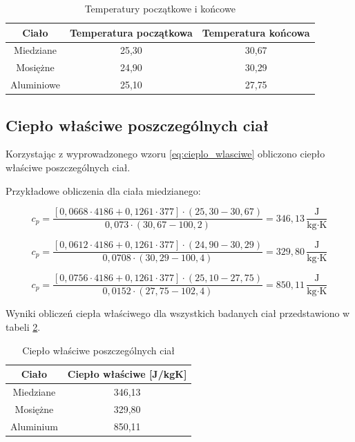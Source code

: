\documentclass[a4paper,12pt]{article}
\begin{document}
\begin{table}[h]
    \centering
    \begin{tabular}{|c|c|c|}
        \hline
        \textbf{Ciało} & \textbf{Temperatura początkowa} & \textbf{Temperatura końcowa} \\
        \hline
        Miedziane & 25{,}30 & 30{,}67 \\
        \hline
        Mosiężne & 24{,}90 & 30{,}29 \\
        \hline
        Aluminiowe & 25{,}10 & 27{,}75 \\
        \hline
    \end{tabular}
    \caption{Temperatury początkowe i końcowe}
    \label{tab:temperatury}
\end{table}




\subsection{Ciepło właściwe poszczególnych ciał}

Korzystając z wyprowadzonego wzoru \ref{eq:cieplo_wlasciwe} obliczono ciepło właściwe poszczególnych ciał.

Przykładowe obliczenia dla ciała miedzianego:

\begin{equation*}
    c_p = \frac{[0{,}0668 \cdot 4186 + 0{,}1261 \cdot 377] \cdot (25{,}30 - 30{,}67)}{0{,}073 \cdot (30{,}67 - 100{,}2)} = 346{,}13\,\frac{\text{J}}{\text{kg} \cdot \text{K}}
\end{equation*}

\begin{equation*}
    c_p = \frac{[0{,}0612 \cdot 4186 + 0{,}1261 \cdot 377] \cdot (24{,}90 - 30{,}29)}{0{,}0708 \cdot (30{,}29 - 100{,}4)} = 329{,}80\,\frac{\text{J}}{\text{kg} \cdot \text{K}}
\end{equation*}

\begin{equation*}
    c_p = \frac{[0{,}0756 \cdot 4186 + 0{,}1261 \cdot 377] \cdot (25{,}10 - 27{,}75)}{0{,}0152 \cdot (27{,}75 - 102{,}4)} = 850{,}11\,\frac{\text{J}}{\text{kg} \cdot \text{K}}
\end{equation*}

Wyniki obliczeń ciepła właściwego dla wszystkich badanych ciał przedstawiono w tabeli \ref{tab:cieplo_wlasciwe}.

\begin{table}[H]
    \centering
    \begin{tabular}{|c|c|}
        \hline
        \textbf{Ciało} & \textbf{Ciepło właściwe [J/kgK]} \\
        \hline
        Miedziane & 346{,}13 \\
        \hline
        Mosiężne & 329{,}80 \\
        \hline
        Aluminium & 850{,}11 \\
        \hline
    \end{tabular}
    \caption{Ciepło właściwe poszczególnych ciał}
    \label{tab:cieplo_wlasciwe}
\end{table}
\end{document}
